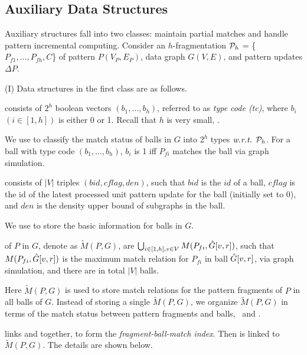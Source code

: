 \subsection{Auxiliary Data Structures}
\label{subsec-auxstr}

Auxiliary structures fall into two classes:
maintain partial matches and handle pattern incremental computing. Consider an $h$-fragmentation ${\cal P}_h$ = \{$P_{f1}, \ldots, P_{fh}, C$\} of pattern $P(V_P, E_P)$, data graph $G(V, E)$, and pattern updates $\Delta P$.


\stab(I) Data structures in the first class are as follows.

 consists of $2^h$ boolean vectors $(b_1,\ldots,b_h)$, referred to as {\em type code (tc)}, where $b_i$ $(i\in [1,h])$ is either 0 or 1. Recall that $h$ is very small, .

We use \fs to classify the match status of balls in $G$ into $2^h$ types $\emph{w.r.t.}$ ${\cal P}_h$.
For a ball with type code $(b_1,\ldots,b_h)$, $b_i$ is 1 iff $P_{fi}$ matches the ball via graph simulation.

\vspace{0.4ex}
 consists of $|V|$ triples $(bid, cflag, den)$, such that $bid$ is the $id$ of a ball,
$cflag$ is the id of the latest processed unit pattern update for the ball (initially set to $0$),
and $den$ is the density upper bound of subgraphs in the ball.

We use \bs to store the basic information for balls in $G$.

\vspace{0.4ex}
 of $P$ in $G$, denote as $\tilde{M}(P,G)$,
are $\bigcup_{i\in[1,h], v\in V} M(P_{fi},\hat{G}{[v,r]})$,
such that $M(P_{fi},\hat{G}{[v,r]})$ is the maximum match relation for $P_{fi}$ in ball $\hat{G}{[v,r]}$, via graph simulation,
and there are in total $|V|$ balls.

Here $\tilde{M}(P,G)$ is used to store match relations for the pattern fragments of $P$ in all balls of $G$. Instead of storing a single $\tilde{M}(P, G)$, we organize $\tilde{M}(P, G)$ in terms of the match status between pattern fragments and balls, \ie\ \fs and \bs.

\vspace{0.4ex}
 links \fs and \bs together, to form the {\em fragment-ball-match index}. Then \fb is linked to $\tilde{M}(P,G)$. The details are shown below.

